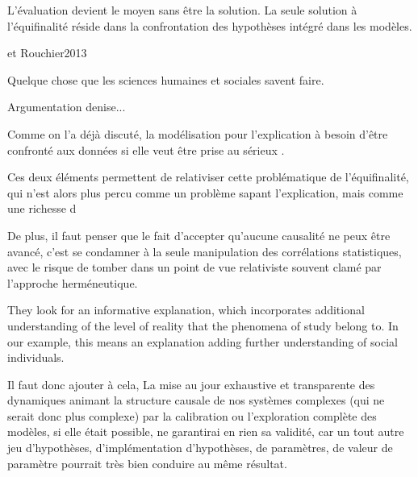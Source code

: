 L'évaluation devient le moyen sans être la solution. La seule solution à l'équifinalité réside dans la confrontation des hypothèses intégré dans les modèles. 


et Rouchier2013


Quelque chose que les sciences humaines et sociales savent faire.

Argumentation denise...







Comme on l'a déjà discuté, la modélisation pour l'explication à besoin d'être confronté aux données si elle veut être prise au sérieux \autocite{Banos2013}.






Ces deux éléments permettent de relativiser cette problématique de l'équifinalité, qui n'est alors plus percu comme un problème sapant l'explication, mais comme une richesse d






De plus, il faut penser que le fait d'accepter qu'aucune causalité ne peux être avancé, c'est se condamner à la seule manipulation des corrélations statistiques, avec le risque de tomber dans un point de vue relativiste souvent clamé par l'approche herméneutique.






They look for an informative explanation, which incorporates additional understanding of the level of reality that the phenomena of study belong to. In our example, this means an explanation adding further understanding of social individuals.



































Il faut donc ajouter à cela, La mise au jour exhaustive et transparente des dynamiques animant la structure causale de nos systèmes complexes (qui ne serait donc plus complexe) par la calibration ou l'exploration complète des modèles, si elle était possible, ne garantirai en rien sa validité, car un tout autre jeu d'hypothèses, d'implémentation d'hypothèses, de paramètres, de valeur de paramètre pourrait très bien conduire au même résultat.

